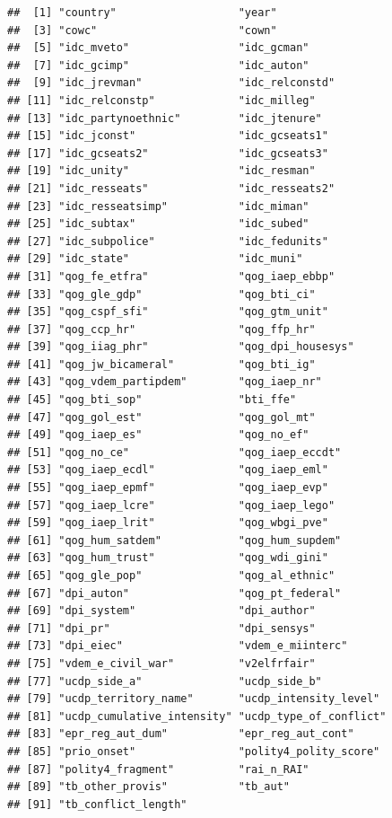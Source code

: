 \documentclass[
]{article}
\begin{document}
\begin{verbatim}
##  [1] "country"                   "year"                     
##  [3] "cowc"                      "cown"                     
##  [5] "idc_mveto"                 "idc_gcman"                
##  [7] "idc_gcimp"                 "idc_auton"                
##  [9] "idc_jrevman"               "idc_relconstd"            
## [11] "idc_relconstp"             "idc_milleg"               
## [13] "idc_partynoethnic"         "idc_jtenure"              
## [15] "idc_jconst"                "idc_gcseats1"             
## [17] "idc_gcseats2"              "idc_gcseats3"             
## [19] "idc_unity"                 "idc_resman"               
## [21] "idc_resseats"              "idc_resseats2"            
## [23] "idc_resseatsimp"           "idc_miman"                
## [25] "idc_subtax"                "idc_subed"                
## [27] "idc_subpolice"             "idc_fedunits"             
## [29] "idc_state"                 "idc_muni"                 
## [31] "qog_fe_etfra"              "qog_iaep_ebbp"            
## [33] "qog_gle_gdp"               "qog_bti_ci"               
## [35] "qog_cspf_sfi"              "qog_gtm_unit"             
## [37] "qog_ccp_hr"                "qog_ffp_hr"               
## [39] "qog_iiag_phr"              "qog_dpi_housesys"         
## [41] "qog_jw_bicameral"          "qog_bti_ig"               
## [43] "qog_vdem_partipdem"        "qog_iaep_nr"              
## [45] "qog_bti_sop"               "bti_ffe"                  
## [47] "qog_gol_est"               "qog_gol_mt"               
## [49] "qog_iaep_es"               "qog_no_ef"                
## [51] "qog_no_ce"                 "qog_iaep_eccdt"           
## [53] "qog_iaep_ecdl"             "qog_iaep_eml"             
## [55] "qog_iaep_epmf"             "qog_iaep_evp"             
## [57] "qog_iaep_lcre"             "qog_iaep_lego"            
## [59] "qog_iaep_lrit"             "qog_wbgi_pve"             
## [61] "qog_hum_satdem"            "qog_hum_supdem"           
## [63] "qog_hum_trust"             "qog_wdi_gini"             
## [65] "qog_gle_pop"               "qog_al_ethnic"            
## [67] "dpi_auton"                 "qog_pt_federal"           
## [69] "dpi_system"                "dpi_author"               
## [71] "dpi_pr"                    "dpi_sensys"               
## [73] "dpi_eiec"                  "vdem_e_miinterc"          
## [75] "vdem_e_civil_war"          "v2elfrfair"               
## [77] "ucdp_side_a"               "ucdp_side_b"              
## [79] "ucdp_territory_name"       "ucdp_intensity_level"     
## [81] "ucdp_cumulative_intensity" "ucdp_type_of_conflict"    
## [83] "epr_reg_aut_dum"           "epr_reg_aut_cont"         
## [85] "prio_onset"                "polity4_polity_score"     
## [87] "polity4_fragment"          "rai_n_RAI"                
## [89] "tb_other_provis"           "tb_aut"                   
## [91] "tb_conflict_length"
\end{verbatim}
\end{document}

